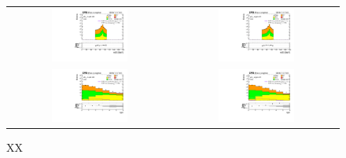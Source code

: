  \begin{figure}[tbh!]
 \begin{center}
 \begin{tabular}{cc}
 \includegraphics[width=0.48\textwidth]{figures/Part4/Evt/llM_OnZ_ee}&
 \includegraphics[width=0.48\textwidth]{figures/Part4/Evt/llM_OnZ_mumu}\\
  \includegraphics[width=0.48\textwidth]{figures/Part4/Evt/njet_OnZ_ee}&
 \includegraphics[width=0.48\textwidth]{figures/Part4/Evt/njet_OnZ_mumu}\\
 \end{tabular}
 \caption{XX}
 \label{fig:DY_CR}
 \end{center}
 \end{figure}